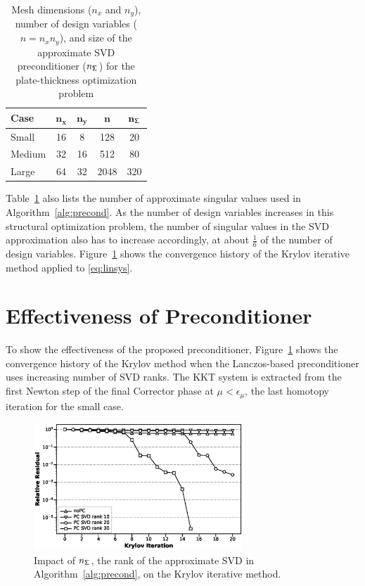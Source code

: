 \begin{table}[tbp]
  \begin{center}
    \caption{Mesh dimensions ($n_x$ and $n_y$), number of design variables ($n =
      n_x n_y$), and size of the approximate SVD preconditioner
      ($n_{\mathsf{\Sigma}}$) for the plate-thickness optimization
      problem \label{tab:mesh_sizes}}
  \begin{tabular}{ l c c c c}
    \textbf{Case} & $\mathbf{n_x}$  & $\mathbf{n_y}$ & $\mathbf{n}$
    & $\mathbf{{n_{\mathsf{\Sigma}}}}$
    \\ \hline
    \rule{0ex}{3ex}%
    Small  &   16 & 8  & 128  & 20 \\ 
    Medium &   32 & 16 & 512  & 80 \\  
    Large  &   64 & 32 & 2048 & 320  
  \end{tabular}
  \end{center}
\end{table}

Table~\ref{tab:mesh_sizes} also lists the number of approximate singular values
used in Algorithm~\ref{alg:precond}.  As the number of design variables
increases in this structural optimization problem, the number of singular values
in the SVD approximation also has to increase accordingly, at about $\frac{1}{6}$
of the number of design variables.
Figure~\ref{fig:svdrank} shows the convergence history of the Krylov iterative
method applied to \eqref{eq:linsys}.  

\section{Effectiveness of Preconditioner}
To show the effectiveness of the proposed preconditioner, 
Figure~\ref{fig:svdrank} shows the convergence history of the Krylov
method when the Lanczos-based preconditioner uses 
increasing number of SVD ranks. The KKT system is extracted from 
the first Newton step of the final Corrector phase 
at $\mu < \epsilon_{\mu}$, the last homotopy iteration for the small case. 

\begin{figure}[tbp]
  \centering
  \includegraphics[width=0.7\textwidth]{./figs/chap6_fstopo/tiny_svd_ranks.eps}
  \caption{Impact of $n_{\mathsf{\Sigma}}$, the rank of the approximate SVD in
    Algorithm~\ref{alg:precond}, on the Krylov iterative method.
  \label{fig:svdrank}}
\end{figure}

